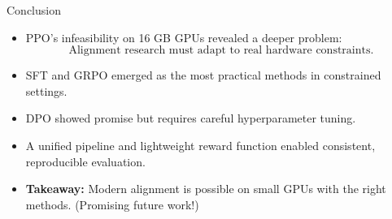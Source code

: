 \documentclass[10pt]{beamer}
\begin{document}
\begin{frame}{Conclusion}
\large

\begin{itemize}
    \item<1-> PPO's infeasibility on 16 GB GPUs revealed a deeper problem:  
    \[
        \text{Alignment research must adapt to real hardware constraints.}
    \]

    \vspace{0.35cm}

    \item<1-> SFT and GRPO emerged as the most practical methods in constrained settings.

    \vspace{0.35cm}

    \item<1-> DPO showed promise but requires careful hyperparameter tuning.

    \vspace{0.35cm}

    \item<2-> A unified pipeline and lightweight reward function enabled  
    consistent, reproducible evaluation.

    \vspace{0.35cm}

    \item<2-> \textbf{Takeaway:}  
    Modern alignment is possible on small GPUs  with the right methods. (Promising future work!)
\end{itemize}

\end{frame}
\end{document}
